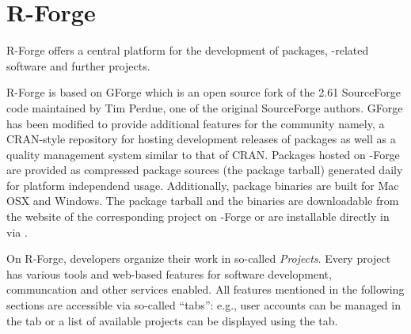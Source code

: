 \section{R-Forge}
R-Forge offers a central platform for the development of \R{}
packages, \R{}-related software and further projects. 

R-Forge is based on GForge \citep{forge:copeland_et_al:2006} which is
an open source fork of the 2.61 SourceForge code maintained by Tim
Perdue, one of the original SourceForge authors. GForge has been
modified to provide additional features for the \R{} community namely,
a CRAN-style repository for hosting development releases of \R{}
packages as well as a quality management system similar to that of
CRAN.
Packages hosted on \R{}-Forge are provided as compressed package
sources (the package tarball) generated daily for platform independend
usage. Additionally, package binaries are built for Mac OSX and
Windows. The package tarball and the binaries are downloadable from
the website of the corresponding project on \R{}-Forge or are
installable directly in \R{} via .






On R-Forge, developers organize their work
in so-called \textit{Projects}. Every project has various tools and
web-based features for software development, communcation and other
services enabled. All features mentioned in the 
following sections are accessible via so-called 
``tabs'': e.g., user accounts can be managed in the  tab or
a list of available projects can be displayed using the
 tab.

